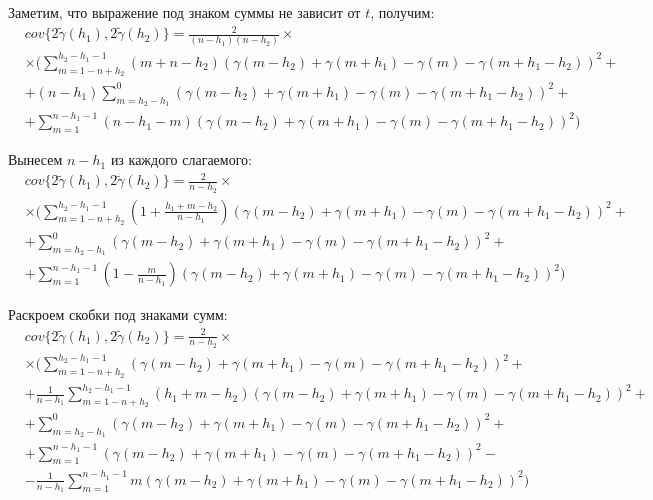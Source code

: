 Заметим, что выражение под знаком суммы не зависит от $t$, получим:
\begin{eqnarray*}
\nonumber
	& cov\{ 2 \tilde{\gamma}(h_1), 2 \tilde{\gamma}(h_2) \} = \frac{2}{(n - h_1) (n - h_2)} \times \\
	& \times (\sum_{m = 1 - n + h_2}^{h_2 - h_1 - 1}(m + n - h_2)(\gamma(m - h_2) + \gamma(m + h_1) - \gamma(m) - \gamma(m + h_1 - h_2))^2 + \\
	& + (n - h_1)\sum_{m = h_2 - h_1}^{0}(\gamma(m - h_2) + \gamma(m + h_1) - \gamma(m) - \gamma(m + h_1 - h_2))^2 + \\
	& + \sum_{m = 1}^{n - h_1 - 1}(n - h_1 - m)(\gamma(m - h_2) + \gamma(m + h_1) - \gamma(m) - \gamma(m + h_1 - h_2))^2)
\end{eqnarray*}

Вынесем $ n - h_1 $ из каждого слагаемого:
\begin{eqnarray*}
\nonumber
	& cov\{ 2 \tilde{\gamma}(h_1), 2 \tilde{\gamma}(h_2) \} = \frac{2}{n - h_2} \times \\
	& \times (\sum_{m = 1 - n + h_2}^{h_2 - h_1 - 1} (1 + \frac{h_1 + m - h_2}{n - h_1})(\gamma(m - h_2) + \gamma(m + h_1) - \gamma(m) - \gamma(m + h_1 - h_2))^2 + \\
	& + \sum_{m = h_2 - h_1}^{0}(\gamma(m - h_2) + \gamma(m + h_1) - \gamma(m) - \gamma(m + h_1 - h_2))^2 + \\
	& + \sum_{m = 1}^{n - h_1 - 1}(1 - \frac{m}{n - h_1})(\gamma(m - h_2) + \gamma(m + h_1) - \gamma(m) - \gamma(m + h_1 - h_2))^2)
\end{eqnarray*}

Раскроем скобки под знаками сумм:
\begin{eqnarray*}
\nonumber
	& cov\{ 2 \tilde{\gamma}(h_1), 2 \tilde{\gamma}(h_2) \} = \frac{2}{n - h_2} \times \\
	& \times (\sum_{m = 1 - n + h_2}^{h_2 - h_1 - 1} (\gamma(m - h_2) + \gamma(m + h_1) - \gamma(m) - \gamma(m + h_1 - h_2))^2 + \\
	& + \frac{1}{n - h_1} \sum_{m = 1 - n + h_2}^{h_2 - h_1 - 1} (h_1 + m - h_2)(\gamma(m - h_2) + \gamma(m + h_1) - \gamma(m) - \gamma(m + h_1 - h_2))^2 + \\
	& + \sum_{m = h_2 - h_1}^{0}(\gamma(m - h_2) + \gamma(m + h_1) - \gamma(m) - \gamma(m + h_1 - h_2))^2 + \\
	& + \sum_{m = 1}^{n - h_1 - 1}(\gamma(m - h_2) + \gamma(m + h_1) - \gamma(m) - \gamma(m + h_1 - h_2))^2 - \\
	& - \frac{1}{n - h_1} \sum_{m = 1}^{n - h_1 - 1} m (\gamma(m - h_2) + \gamma(m + h_1) - \gamma(m) - \gamma(m + h_1 - h_2))^2)
\end{eqnarray*}

